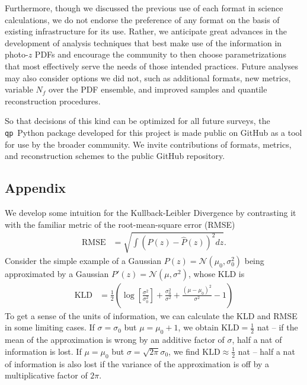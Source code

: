 \documentclass[\docopts]{\docclass}
\newcommand{\qp}{\texttt{qp}}
\newcommand{\pz}{photo-$z$ PDF}
\begin{document}
Furthermore, though we discussed the previous use of each format in science 
calculations, we do not endorse the preference of any format on the basis of 
existing infrastructure for its use.
Rather, we anticipate great advances in the development of analysis techniques 
that best make use of the information in \pz s and encourage the community to 
then choose parametrizations that most effectively serve the needs of those 
intended practices.
Future analyses may also consider options we did not, such as additional 
formats, new metrics, variable $N_{f}$ over the PDF ensemble, and improved 
samples and quantile reconstruction procedures.

So that decisions of this kind can be optimized for all future surveys, the 
\qp\ Python package developed for this project is made public on GitHub as a 
tool for use by the broader community.
We invite contributions of formats, metrics, and reconstruction schemes to the 
public GitHub repository.


\subsection*{Appendix}
\label{sec:kld}

We develop some intuition for the Kullback-Leibler Divergence by contrasting it 
with the familiar metric of the root-mean-square error (RMSE)
\begin{align}
  \label{eq:rmse}
  \mathrm{RMSE} &= \sqrt{\int (P(z) - \hat{P}(z))^{2} dz}.
\end{align}
Consider the simple example of a Gaussian $P(z)=\mathcal{N}(\mu_{0}, 
\sigma_{0}^{2})$ being approximated by a Gaussian $P'(z)=\mathcal{N}(\mu, 
\sigma^{2})$, whose KLD is
\begin{align}
  \label{eq:gaussian}
  \mathrm{KLD} &= 
\frac{1}{2}\left(\log\left[\frac{\sigma^{2}}{\sigma_{0}^{2}}\right] + 
\frac{\sigma_{0}^{2}}{\sigma^{2}} + \frac{(\mu-\mu_{0})^{2}}{\sigma^{2}} - 
1\right)
\end{align}
To get a sense of the units of information, we can calculate the KLD and RMSE 
in some limiting cases.
If $\sigma=\sigma_{0}$ but $\mu=\mu_{0}+1$, we obtain 
$\mathrm{KLD}=\frac{1}{2}$ nat -- if the mean of the approximation is wrong by 
an additive factor of $\sigma$, half a nat of information is lost.
If $\mu=\mu_{0}$ but $\sigma=\sqrt{2\pi}\sigma_{0}$, we find 
$\mathrm{KLD}\approx\frac{1}{2}$ nat -- half a nat of information is also lost 
if the variance of the approximation is off by a multiplicative factor of 
$2\pi$.
\end{document}
